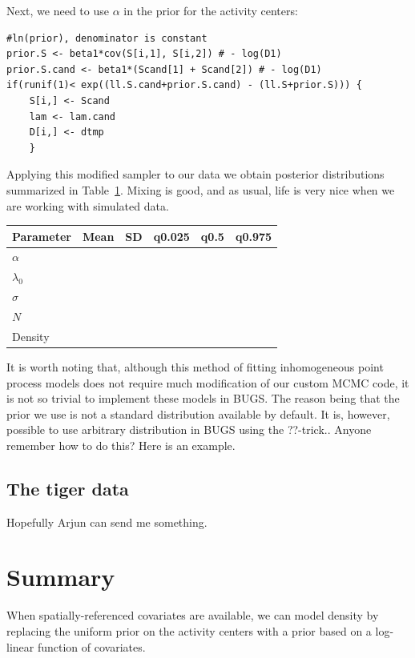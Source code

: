 \documentclass{book}
\begin{document}
Next, we need to use $\alpha$ in the prior for the activity centers:

\begin{small}
\begin{verbatim}
#ln(prior), denominator is constant
prior.S <- beta1*cov(S[i,1], S[i,2]) # - log(D1)
prior.S.cand <- beta1*(Scand[1] + Scand[2]) # - log(D1)
if(runif(1)< exp((ll.S.cand+prior.S.cand) - (ll.S+prior.S))) {
    S[i,] <- Scand
    lam <- lam.cand
    D[i,] <- dtmp
    }
\end{verbatim}
\end{small}

Applying this modified sampler to our data we obtain posterior
distributions summarized in Table~\ref{tab:simIPP}. Mixing is good, and as usual,
life is very nice when we are working with simulated data.

\begin{table}
\centering
\begin{tabular}{lccccc}
Parameter & Mean & SD  & q0.025 & q0.5 & q0.975 \\
\hline
$\alpha$    &&&&& \\
$\lambda_0$  &&&&& \\
$\sigma$    &&&&& \\
$N$        &&&&& \\
Density     &&&&& \\
\hline
\end{tabular}
\label{tab:simIPP}
\end{table}

It is worth noting that, although this method of fitting inhomogeneous
point process models does not require much modification of our custom MCMC
code, it is not so trivial to
implement these models in BUGS. The reason being
that the prior we use is not a standard distribution available by
default. It is, however, possible to use arbitrary distribution in
BUGS using the ??-trick.. Anyone remember how to do this? Here is an
example.


\subsection{The tiger data}

Hopefully Arjun can send me something.


\section{Summary}

When spatially-referenced covariates are available, we can model
density by replacing the uniform prior on the activity centers with a
prior based on a log-linear function of covariates.
\end{document}
